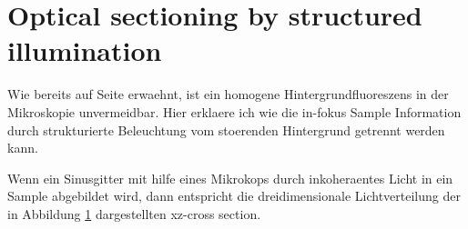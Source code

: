 \section{Optical sectioning by structured illumination}
\begin{summary}
  Wie bereits auf Seite \pageref{sec:sectioning-intro} erwaehnt, ist
  ein homogene Hintergrundfluoreszens in der Mikroskopie unvermeidbar.
  Hier erklaere ich wie die in-fokus Sample Information durch
  strukturierte Beleuchtung vom stoerenden Hintergrund getrennt werden
  kann.
\end{summary}

Wenn ein Sinusgitter mit hilfe eines Mikrokops durch inkoheraentes
Licht in ein Sample abgebildet wird, dann entspricht die
dreidimensionale Lichtverteilung der in Abbildung
\ref{fig:hilo-sec-Illum2} dargestellten xz-cross section.

\begin{figure}[htbp]
  \centering
  \caption{}
  \label{fig:hilo-sec-Illum2}
\end{figure}




\begin{figure}[htbp]
  \centering
  \caption{}
  \label{fig:hilo-sec-comparison}
\end{figure}

\citep{Neil1997}

\citep{Benedetti1997}


\begin{figure}[htbp]
  \centering
  \caption{}
  \label{fig:hilo-method-description}
\end{figure}





